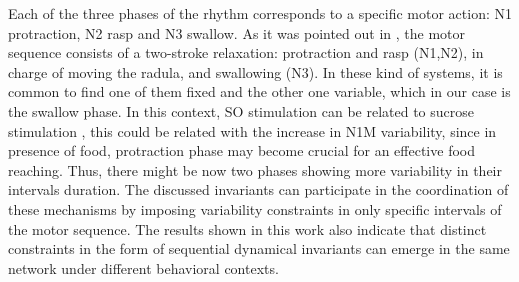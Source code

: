 Each of the three phases of the rhythm corresponds to a specific motor action: N1 protraction, N2 rasp and N3 swallow. As it was pointed out in \textcite{elliott_temporal_1991}, the motor sequence consists of a two-stroke relaxation: protraction and rasp (N1,N2), in charge of moving the radula, and swallowing (N3). In these kind of systems, it is common to find one of them fixed and the other one variable, which in our case is the swallow phase. In this context, SO stimulation can be related to sucrose stimulation \parencite{benjamin_distributed_2012,kemenes_analysis_1994},
this could be related with the increase in N1M variability, since in presence of food, protraction phase may become crucial for an effective food reaching. Thus, there might be now two phases showing more variability in their intervals duration. The discussed invariants can participate in the coordination of these mechanisms by imposing variability constraints in only specific intervals of the motor sequence. The results shown in this work also indicate that distinct constraints in the form of sequential dynamical invariants can emerge in the same network under different behavioral contexts.

